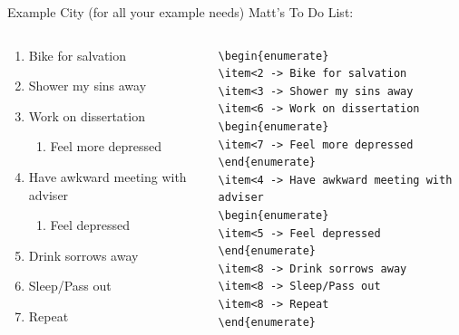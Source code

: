 \documentclass[mathserif, xcolor=svgnames]{beamer}
\begin{document}
\begin{frame}[fragile]{Example City (for all your example needs)}
Matt's To Do List:
\begin{columns}

\begin{column}{2in}
\begin{enumerate}
\item<2 -> Bike for salvation
\item<3 -> Shower my sins away
\item<6 -> Work on dissertation
\begin{enumerate}
\item<7 -> Feel more depressed
\end{enumerate}
\item<4 -> Have awkward meeting with adviser
\begin{enumerate}
\item<5 -> Feel depressed
\end{enumerate}
\item<8 -> Drink sorrows away
\item<8 -> Sleep/Pass out
\item<8 -> Repeat
\end{enumerate}
\end{column}

\begin{column}{2in}
\begin{scriptsize}
\begin{verbatim}
\begin{enumerate}
\item<2 -> Bike for salvation
\item<3 -> Shower my sins away
\item<6 -> Work on dissertation
\begin{enumerate}
\item<7 -> Feel more depressed
\end{enumerate}
\item<4 -> Have awkward meeting with adviser
\begin{enumerate}
\item<5 -> Feel depressed
\end{enumerate}
\item<8 -> Drink sorrows away
\item<8 -> Sleep/Pass out
\item<8 -> Repeat
\end{enumerate}
\end{verbatim}
\end{scriptsize}
\end{column}
\end{columns}

\end{frame}
\end{document}
